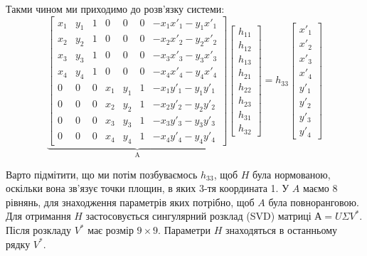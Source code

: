 Такми чином ми приходимо до розв'язку системи:
\begin{equation}
    \underbrace{
        \begin{bmatrix}
            x_1 & y_1 & 1 & 0   & 0   & 0 & -x_1x'_1 -y_1x'_1\\
            x_2 & y_2 & 1 & 0   & 0   & 0 & -x_2x'_2 -y_2x'_2\\
            x_3 & y_3 & 1 & 0   & 0   & 0 & -x_3x'_3 -y_3x'_3\\
            x_4 & y_4 & 1 & 0   & 0   & 0 & -x_4x'_4 -y_4x'_4\\
            0   & 0   & 0 & x_1 & y_1 & 1 & -x_1y'_1 -y_1y'_1\\
            0   & 0   & 0 & x_2 & y_2 & 1 & -x_2y'_2 -y_2y'_2\\
            0   & 0   & 0 & x_3 & y_3 & 1 & -x_3y'_3 -y_3y'_3\\
            0   & 0   & 0 & x_4 & y_4 & 1 & -x_4y'_4 -y_4y'_4
        \end{bmatrix}
    }_\textrm{A}
    \begin{bmatrix}
        h_{11}\\
        h_{12}\\
        h_{13}\\
        h_{21}\\
        h_{22}\\
        h_{23}\\
        h_{31}\\
        h_{32}
    \end{bmatrix}
    =
    h_{33}
    \begin{bmatrix}
        x'_1\\
        x'_2\\
        x'_3\\
        x'_4\\
        y'_1\\
        y'_2\\
        y'_3\\
        y'_4
    \end{bmatrix}
\end{equation}

Варто підмітити, що ми потім  позбуваємось  $h_{33}$, щоб $H$ була нормованою, оскільки вона 
зв'язує точки площин, в яких 3-тя координата 1.
У $A$ маємо 8 рівнянь, для знаходження параметрів яких потрібно, щоб $A$ була повноранговою.
Для отримання $H$ застосовується сингулярний розклад (SVD) матриці $А = U\Sigma V^*$.
Після розкладу $V^*$ має розмір $9\times9$. Параметри $H$ знаходяться в останньому рядку $V^*$.

